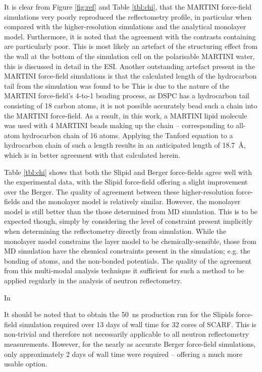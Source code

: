 \documentclass[twoside,twocolumn,9pt]{article}
\begin{document}
It is clear from Figure \ref{fig:ref} and Table \ref{tbl:chi}, that the MARTINI force-field simulations very poorly reproduced the reflectometry profile, in particular when compared with the higher-resolution simulations and the analytical monolayer model.
Furthermore, it is noted that the agreement with the contrasts containing  are particularly poor.
This is most likely an artefact of the structuring effect from the wall at the bottom of the simulation cell on the polarisable MARTINI water, this is discussed in detail in the ESI.
Another outstanding artefact present in the MARTINI force-field simulations is that the calculated length of the hydrocarbon tail from the simulation was found to be %
This is due to the nature of the MARTINI force-field's 4-to-1 beading process, as DSPC has a hydrocarbon tail consisting of 18 carbon atoms, it is not possible accurately bead such a chain into the MARTINI force-field.
As a result, in this work, a MARTINI lipid molecule was used with 4 MARTINI beads making up the chain -- corresponding to all-atom hydrocarbon chain of 16 atoms.
Applying the Tanford equation to a hydrocarbon chain of such a length results in an anticipated length of \SI{18.7}{\angstrom}, which is in better agreement with that calculated herein.

Table \ref{tbl:chi} shows that both the Slipid and Berger force-fields agree well with the experimental data, with the Slipid force-field offering a slight improvement over the Berger.
The quality of agreement between these higher-resolution force-fields and the monolayer model is relatively similar.
However, the monolayer model is still better than the those determined from MD simulation.
This is to be expected though, simply by considering the level of constraint present implicitly when determining the reflectometry directly from simulation.
While the monolayer model constrains the layer model to be chemically-sensible, those from MD simulation have the chemical constraints present in the simulation; e.g. the bonding of atoms, and the non-bonded potentials.
The quality of the agreement from this multi-modal analysis technique it sufficient for such a method to be applied regularly in the analysis of neutron reflectometry.

In

It should be noted that to obtain the \SI{50}{\nano\second} production run for the Slipids force-field simulation required over 13 days of wall time for 32 cores of SCARF.
This is non-trivial and therefore not necessarily applicable to all neutron reflectometry measurements.
However, for the nearly as accurate Berger force-field simulations, only approximately 2 days of wall time were required -- offering a much more usable option.
\end{document}

